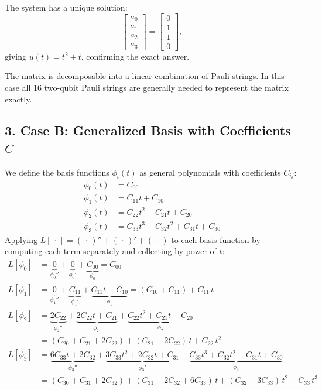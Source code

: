 \documentclass{article}
\begin{document}
The system has a unique solution:
\begin{equation}
\begin{bmatrix} a_0 \\ a_1 \\ a_2 \\ a_3 \end{bmatrix}
= \begin{bmatrix} 0 \\ 1 \\ 1 \\ 0 \end{bmatrix},
\end{equation}
giving $u(t) = t^2 + t$, confirming the exact answer.

The matrix is decomposable into a linear combination of Pauli strings.
In this case all 16 two-qubit Pauli strings are generally needed to represent the matrix exactly.

\subsection*{3. Case B: Generalized Basis with Coefficients $C$}
We define the basis functions $\phi_i(t)$ as general polynomials with coefficients $C_{ij}$:
\begin{align*}
    \phi_0(t) &= C_{00} \\
    \phi_1(t) &= C_{11}t + C_{10} \\
    \phi_2(t) &= C_{22}t^2 + C_{21}t + C_{20} \\
    \phi_3(t) &= C_{33}t^3 + C_{32}t^2 + C_{31}t + C_{30}
\end{align*}
Applying $L[\,\cdot\,] = (\,\cdot\,)'' + (\,\cdot\,)' + (\,\cdot\,)$ to each basis function by
computing each term separately and collecting by power of $t$:
\begin{align*}
    L[\phi_0]
        &= \underbrace{0}_{\phi_0''} + \underbrace{0}_{\phi_0'} + \underbrace{C_{00}}_{\phi_0}
         = C_{00} \\[6pt]
    L[\phi_1]
        &= \underbrace{0}_{\phi_1''} + \underbrace{C_{11}}_{\phi_1'} + \underbrace{C_{11}t + C_{10}}_{\phi_1}
         = (C_{10} + C_{11}) + C_{11}\,t \\[6pt]
    L[\phi_2]
        &= \underbrace{2C_{22}}_{\phi_2''} + \underbrace{2C_{22}t + C_{21}}_{\phi_2'}
           + \underbrace{C_{22}t^2 + C_{21}t + C_{20}}_{\phi_2} \\
        &= (C_{20} + C_{21} + 2C_{22}) + (C_{21} + 2C_{22})\,t + C_{22}\,t^2 \\[6pt]
    L[\phi_3]
        &= \underbrace{6C_{33}t + 2C_{32}}_{\phi_3''}
           + \underbrace{3C_{33}t^2 + 2C_{32}t + C_{31}}_{\phi_3'}
           + \underbrace{C_{33}t^3 + C_{32}t^2 + C_{31}t + C_{30}}_{\phi_3} \\
        &= (C_{30} + C_{31} + 2C_{32})
           + (C_{31} + 2C_{32} + 6C_{33})\,t
           + (C_{32} + 3C_{33})\,t^2
           + C_{33}\,t^3
\end{align*}
\end{document}
